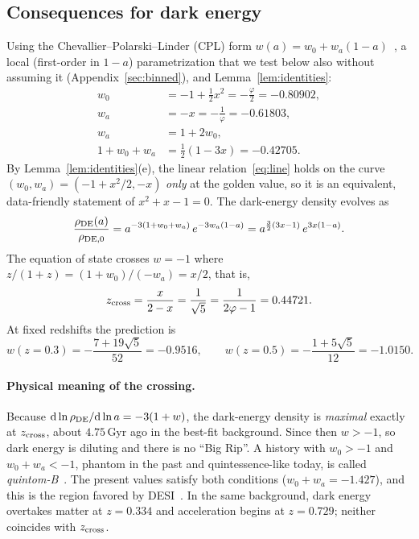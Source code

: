 \documentclass[11pt]{article}
\theoremstyle{definition}
\theoremstyle{remark}
\newcommand{\gr}{\varphi}
\begin{document}
\subsection{Consequences for dark energy}

Using the Chevallier--Polarski--Linder (CPL) form $w(a) = w_0 + w_a(1-a)$~\cite{CPL1,CPL2}, a local (first-order in $1-a$) parametrization that we test below also without assuming it (Appendix~\ref{sec:binned}), and Lemma~\ref{lem:identities}:
\begin{align}
w_0 &= -1 + \tfrac12 x^2 = -\frac{\gr}{2} = -0.80902, \label{eq:w0}\\
w_a &= -x = -\frac{1}{\gr} = -0.61803, \label{eq:wa}\\
w_a &= 1 + 2 w_0, \label{eq:line}\\
1 + w_0 + w_a &= \tfrac12(1 - 3x) = -0.42705 .
\end{align}
By Lemma~\ref{lem:identities}(e), the linear relation~\eqref{eq:line} holds on the curve $(w_0, w_a) = (-1 + x^2/2, -x)$ \emph{only} at the golden value, so it is an equivalent, data-friendly statement of $x^2 + x - 1 = 0$. The dark-energy density evolves as
\begin{equation}
\frac{\rho_{\rm DE}(a)}{\rho_{\rm DE,0}} = a^{-3(1+w_0+w_a)}\, e^{-3 w_a (1-a)} = a^{\frac32(3x-1)}\, e^{3x(1-a)} .
\end{equation}
The equation of state crosses $w = -1$ where $z/(1+z) = (1+w_0)/(-w_a) = x/2$, that is,
\begin{equation}
z_{\rm cross} = \frac{x}{2-x} = \frac1{\sqrt5} = \frac{1}{2\gr - 1} = 0.44721 .
\end{equation}
At fixed redshifts the prediction is
\begin{equation}
w(z = 0.3) = -\frac{7 + 19\sqrt5}{52} = -0.9516, \qquad w(z = 0.5) = -\frac{1 + 5\sqrt5}{12} = -1.0150 .
\label{eq:fixedz}
\end{equation}

\paragraph{Physical meaning of the crossing.} Because $\mathrm d\ln\rho_{\rm DE}/\mathrm d\ln a = -3(1+w)$, the dark-energy density is \emph{maximal} exactly at $z_{\rm cross}$, about $4.75$\,Gyr ago in the best-fit background. Since then $w > -1$, so dark energy is diluting and there is no ``Big Rip''. A history with $w_0 > -1$ and $w_0 + w_a < -1$, phantom in the past and quintessence-like today, is called \emph{quintom-B}~\cite{QuintomReview}. The present values satisfy both conditions ($w_0 + w_a = -1.427$), and this is the region favored by DESI~\cite{DESI-DR2,QuintomReview}. In the same background, dark energy overtakes matter at $z = 0.334$ and acceleration begins at $z = 0.729$; neither coincides with $z_{\rm cross}$.
\end{document}
